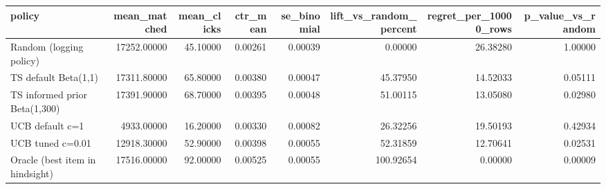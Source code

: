 \begin{tabular}{lrrrrrrr}
\toprule
policy & mean\_matched & mean\_clicks & ctr\_mean & se\_binomial & lift\_vs\_random\_percent & regret\_per\_10000\_rows & p\_value\_vs\_random \\
\midrule
Random (logging policy) & 17252.00000 & 45.10000 & 0.00261 & 0.00039 & 0.00000 & 26.38280 & 1.00000 \\
TS default Beta(1,1) & 17311.80000 & 65.80000 & 0.00380 & 0.00047 & 45.37950 & 14.52033 & 0.05111 \\
TS informed prior Beta(1,300) & 17391.90000 & 68.70000 & 0.00395 & 0.00048 & 51.00115 & 13.05080 & 0.02980 \\
UCB default c=1 & 4933.00000 & 16.20000 & 0.00330 & 0.00082 & 26.32256 & 19.50193 & 0.42934 \\
UCB tuned c=0.01 & 12918.30000 & 52.90000 & 0.00398 & 0.00055 & 52.31859 & 12.70641 & 0.02531 \\
Oracle (best item in hindsight) & 17516.00000 & 92.00000 & 0.00525 & 0.00055 & 100.92654 & 0.00000 & 0.00009 \\
\bottomrule
\end{tabular}
